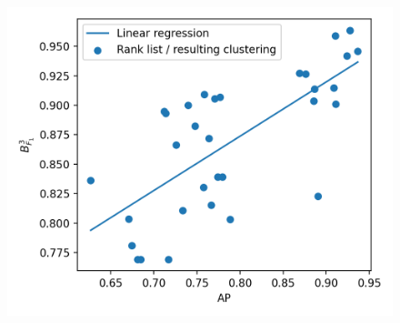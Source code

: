 \begin{figure}
  \includegraphics[width=\linewidth]{img/correlation_average_precision_b3f1_2.png}
\end{figure}

